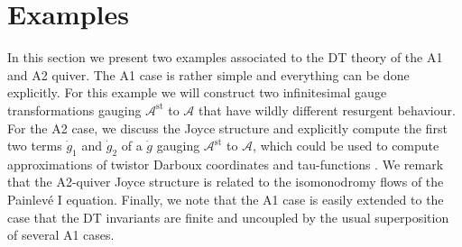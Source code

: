 \documentclass{article}
\theoremstyle{definition}
\numberwithin{equation}{section}
\begin{document}

\section{Examples}\label{exsec}

In this section we present two examples associated to the DT theory of the A1 and A2 quiver. The A1 case is rather simple and everything can be done explicitly. For this example we will construct two infinitesimal gauge transformations gauging $\mathcal{A}^{\text{st}}$ to $\mathcal{A}$ that have wildly different resurgent behaviour.  For the A2 case, we discuss the Joyce structure and explicitly compute the first two terms $\dot{g}_1$ and $\dot{g}_2$ of a $\dot{g}$ gauging $\mathcal{A}^{\text{st}}$ to $\mathcal{A}$, which could be used to compute approximations of twistor Darboux coordinates and tau-functions \cite{BridgelandOsc, BridgelandTau}. We remark that the A2-quiver Joyce structure is related to the isomonodromy flows of the Painlev\'e I equation. Finally, we note that the A1 case is easily extended to the case that the DT invariants are finite and uncoupled by the usual superposition of several A1 cases. 
\end{document}
